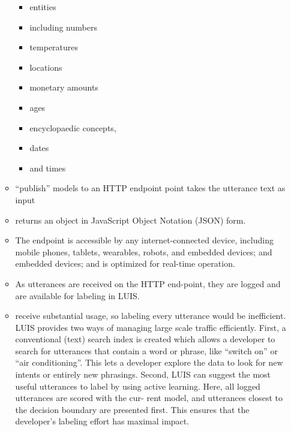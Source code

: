 \begin{itemize}
\begin{itemize}
\begin{itemize}
					\item entities
					\item including numbers
					\item temperatures
					\item locations
					\item monetary amounts
					\item ages
					\item encyclopaedic concepts,
					\item dates
					\item and times
				\end{itemize}
			\item “publish” models to an HTTP endpoint point takes the utterance text as input
			\item returns an object in JavaScript Object Notation (JSON) form.
			\item The endpoint is accessible by any internet-connected device, including mobile phones, tablets, wearables, robots, and embedded devices; and embedded devices; and is optimized for real-time operation.
			\item As utterances are received on the HTTP end-point, they are logged and are available for labeling in LUIS. 
			\item receive substantial usage, so labeling every utterance would be inefficient. LUIS provides two
				ways of managing large scale traffic efficiently.
				First, a conventional (text) search index is created
				which allows a developer to search for utterances
				that contain a word or phrase, like “switch on” or
				“air conditioning”. This lets a developer explore
				the data to look for new intents or entirely new
				phrasings. Second, LUIS can suggest the most
				useful utterances to label by using active learning.
				Here, all logged utterances are scored with the cur-
				rent model, and utterances closest to the decision
				boundary are presented first. This ensures that the
				developer’s labeling effort has maximal impact.
		\end{itemize}
\end{itemize}
